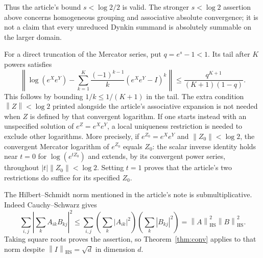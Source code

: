 \documentclass[11pt]{article}
\theoremstyle{definition}
\theoremstyle{remark}
\newcommand{\norm}[1]{\left\lVert #1\right\rVert}
\numberwithin{equation}{section}
\begin{document}
Thus the article's bound $s<\log2/2$ is valid. The stronger $s<\log2$ assertion above concerns homogeneous grouping and associative absolute convergence; it is not a claim that every unreduced Dynkin summand is absolutely summable on the larger domain.

For a direct truncation of the Mercator series, put $q=e^s-1<1$. Its tail after $K$ powers satisfies
\begin{equation}\label{eq:Mercatortail}
 \left\|\log(e^Xe^Y)-\sum_{k=1}^K\frac{(-1)^{k-1}}k(e^Xe^Y-I)^k\right\|
 \leq\frac{q^{K+1}}{(K+1)(1-q)}.
\end{equation}
This follows by bounding $1/k\leq1/(K+1)$ in the tail. The extra condition $\norm Z<\log2$ printed alongside the article's associative expansion is not needed when $Z$ is defined by that convergent logarithm. If one starts instead with an unspecified solution of $e^Z=e^Xe^Y$, a local uniqueness restriction is needed to exclude other logarithms. More precisely, if $e^{Z_0}=e^Xe^Y$ and $\norm{Z_0}<\log2$, the convergent Mercator logarithm of $e^{Z_0}$ equals $Z_0$: the scalar inverse identity holds near $t=0$ for $\log(e^{tZ_0})$ and extends, by its convergent power series, throughout $|t|\norm{Z_0}<\log2$. Setting $t=1$ proves that the article's two restrictions do suffice for its specified $Z_0$.

The Hilbert--Schmidt norm mentioned in the article's note is submultiplicative. Indeed Cauchy--Schwarz gives
\[
 \sum_{i,j}\left|\sum_k A_{ik}B_{kj}\right|^2
 \leq\sum_{i,j}\left(\sum_k|A_{ik}|^2\right)
                      \left(\sum_k|B_{kj}|^2\right)
 =\norm A_{\mathrm{HS}}^2\norm B_{\mathrm{HS}}^2.
\]
Taking square roots proves the assertion, so Theorem~\ref{thm:conv} applies to that norm despite $\norm I_{\mathrm{HS}}=\sqrt d$ in dimension $d$.
\end{document}
